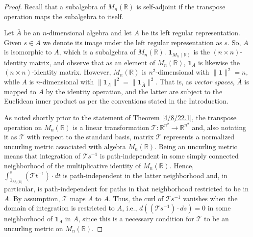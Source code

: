 \documentclass{amsart}
\numberwithin{equation}{section}
\theoremstyle{definition}
\numberwithin{theorem}{section}
\begin{document}
\begin{proof} Recall that a subalgebra of $M_n(\mathbb{R})$ is self-adjoint if the transpose operation maps the subalgebra to itself.

Let $\bar{A}$ be an $n$-dimensional algebra and let $A$ be its left regular representation.  Given $\bar{s}\in\bar{A}$ we denote its image under the left regular representation as $s$.
 So, $\bar{A}$ is isomorphic to $A$, which is a subalgebra of $ M_n(\mathbb{R})$.   $\mathbf{1}_{M_n(\mathbb{R})}$ is the $(n\times n)$-identity matrix, and observe that as an element of $ M_n(\mathbb{R})$, $\mathbf{1}_A$ is likewise the $(n\times n)$-identity matrix.  However, $ M_n(\mathbb{R})$ is $n^2$-dimensional with $\|\mathbf{1}\|^2 = n$, while $A$ is $n$-dimensional with $\|\mathbf{1}_A\|^2 = \|\mathbf{1}_{\bar{A}}\|^2$.  That is, as {\it vector spaces}, $\bar{A}$ is mapped to  $A$ by the identity operation, and the latter are subject to the Euclidean inner product as per the conventions stated in the Introduction.   

As noted shortly prior to the statement of Theorem \ref{4/8/22.1}, the transpose operation on $ M_n(\mathbb{R})$ is a linear transformation $\mathcal{\mathcal{T}}:\mathbb{R}^{n^2}\rightarrow \mathbb{R}^{n^2}$ and, also notating it as $\mathcal{\mathcal{T}}$ with respect to the standard basis, matrix $\mathcal{\mathcal{T}}$ represents a normalized uncurling metric associated with algebra  $ M_n(\mathbb{R})$.  Being an uncurling metric means that integration of $\mathcal{\mathcal{T}}s^{-1}$ is path-independent in some simply connected neighborhood of the multiplicative identity of $ M_n(\mathbb{R})$.  
 Hence, $\int_{\mathbf{1}_{M_n({\mathbb{R})}}}^s (\mathcal{\mathcal{T}}t^{-1})\cdot dt$ is path-independent in the latter neighborhood and, in particular, is path-independent for paths in that neighborhood restricted to be in $A$.  By assumption, $\mathcal{\mathcal{T}}$ maps $A$ to $A$. 
 Thus, the curl of $\mathcal{\mathcal{T}}s^{-1}$ vanishes when the domain of integration is restricted to $A$, i.e., 
  $d((\mathcal{\mathcal{T}}s^{-1})\cdot ds) = 0$ in some neighborhood of $\mathbf{1}_A$ in $A$, since this is a necessary condition for $\mathcal{T}$ to be an uncurling metric on $ M_n(\mathbb{R})$.
  

\end{proof}
\end{document}
